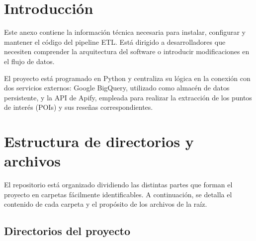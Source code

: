 
\section{Introducción}
Este anexo contiene la información técnica necesaria para instalar, configurar y mantener el código del pipeline ETL. Está dirigido a desarrolladores que necesiten comprender la arquitectura del software o introducir modificaciones en el flujo de datos.

El proyecto está programado en Python y centraliza su lógica en la conexión con dos servicios externos: Google BigQuery, utilizado como almacén de datos persistente, y la API de Apify, empleada para realizar la extracción de los puntos de interés (POIs) y sus reseñas correspondientes.

\section{Estructura de directorios y archivos}
El repositorio está organizado dividiendo las distintas partes que forman el proyecto en carpetas fácilmente identificables. A continuación, se detalla el contenido de cada carpeta y el propósito de los archivos de la raíz.

\subsection{Directorios del proyecto}

